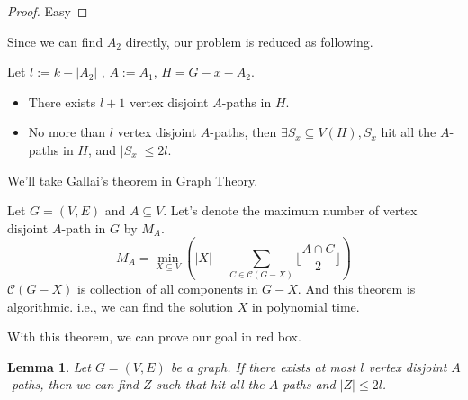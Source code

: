 \documentclass[12pt, a4paper, openany, twoside]{book}
\newtheorem{lem}[thm]{Lemma}
\theoremstyle{definition}
\theoremstyle{remark}
\newcommand{\CC}{{\mathcal {C}}} \newcommand{\CD}{{\mathcal {D}}}
\theoremstyle{plain}
\numberwithin{equation}{section}
\begin{document}
\begin{proof}
    
Easy

\end{proof}

Since we can find $A_2$ directly, our problem is reduced as following. 

\begin{tcolorbox}[colback=yellow!10!white,colframe=red!75!black,title=Want To Show - Reduced Version]

    Let $l := k - |A_2|$ , $A := A_1$, $H = G - x - A_2$. 
    \begin{itemize}
        \item There exists $l + 1$ vertex disjoint $A$-paths in $H$. 
        \item No more than $l$ vertex disjoint $A$-paths, then $\exists S_x \subseteq V(H), S_x$ hit all the $A$-paths in $H$, and $|S_x| \leq 2l$.
    \end{itemize}
    
\end{tcolorbox}

We'll take Gallai's theorem in Graph Theory. 

\begin{tcolorbox}[colback=yellow!10!white,colframe=blue!75!white,title=Gallai's A-path Theorem]

Let $G = (V, E)$ and $A \subseteq V$. 
Let's denote the maximum number of vertex disjoint $A$-path in $G$ by $M_A$. 
\[M_A = \min_{X \subseteq V} \left( |X| + \sum_{C \in \CC(G-X)}\lfloor \frac{A \cap C}{2} \rfloor \right)\]
$\CC(G-X)$ is collection of all components in $G - X$. And this theorem is algorithmic. i.e., we can find 
the solution $X$ in polynomial time. 
\end{tcolorbox}

With this theorem, we can prove our goal in red box. 

\begin{lem}
    
Let $G = (V, E)$ be a graph. If there exists at most $l$ vertex disjoint $A$-paths, 
then we can find $Z$ such that hit all the $A$-paths and $|Z| \leq 2l$. 

\end{lem}
\end{document}
